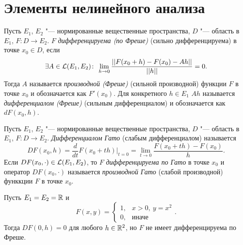 \documentclass[main]{subfiles}
\begin{document}
\section{Элементы нелинейного анализа}%


\begin{definition}
  Пусть \( E_1 \), \( E_2 \) "--- нормированные вещественные пространства,
  \( D \) "--- область в \( E_1 \), \( F: D \to E_2 \).
  \( F \) \emph{дифференцируема (по Фреше)}
  (сильно дифференцируема)
  в точке \( x_0 \in D \),
  если
  \[
    \Exists{A \in \Linears{E_1, E_2}}
    \lim_{h \to 0} \frac{||F(x_0 + h) - F(x_0) - Ah||}{||h||} = 0.
  \]
  Тогда \( A \) называется \emph{производной (Фреше)}
  (сильной производной)
  функции \( F \) в точке \( x_0 \) и обозначается как \( F'(x_0) \).
  Для конкретного \( h \in E_1 \)
  \( Ah \) называется \emph{дифференциалом (Фреше)}
  (сильным дифференциалом)
  и обозначается как \( dF(x_0, h) \).
\end{definition}

\begin{definition}
  Пусть \( E_1 \), \( E_2 \) "--- нормированные вещественные пространства,
  \( D \) "--- область в \( E_1 \), \( F: D \to E_2 \).
  \emph{Дифференциалом Гато} (слабым дифференциалом)
  называется
  \[
    DF(x_0, h) = \frac{d}{dt} F(x_0 + t h) \bigr|_{t=0} =
    \lim_{t \to 0} \frac{F(x_0 + th) - F(x_0)}{h}.
  \]
  Если \( DF(x_0, \cdot) \in \Linears{E_1, E_2} \),
  то \( F \) \emph{дифференцируема по Гато} в точке \( x_0 \)
  и оператор \( DF(x_0, \cdot) \) называется
  \emph{производной Гато} (слабой производной)
  функкции \( F \) в точке \( x_0 \).
\end{definition}

\begin{example}
  Пусть \( E_1 = E_2 = \mathbb{R} \)
  и
  \[
    F(x, y) = \begin{cases}
      1, & x > 0, \: y = x^2 \\
      0, & \text{иначе}
    \end{cases}.
  \]
  Тогда \( DF(0, h) = 0 \) для любого \( h \in \mathbb{R}^2 \),
  но \( F \) не имеет дифференцируема по Фреше.
\end{example}
\end{document}
